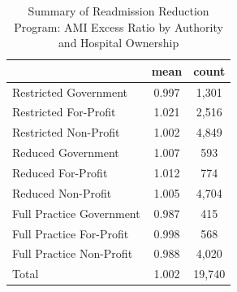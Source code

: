 \begin{table}[htbp]\centering
\def\sym#1{\ifmmode^{#1}\else\(^{#1}\)\fi}
\caption{Summary of Readmission Reduction Program: AMI Excess Ratio by Authority and Hospital Ownership}
\begin{tabular}{l*{1}{cc}}
\toprule
                    &        mean&       count\\
\midrule
Restricted Government&       0.997&       1,301\\
Restricted For-Profit&       1.021&       2,516\\
Restricted Non-Profit&       1.002&       4,849\\
Reduced Government  &       1.007&         593\\
Reduced For-Profit  &       1.012&         774\\
Reduced Non-Profit  &       1.005&       4,704\\
Full Practice Government&       0.987&         415\\
Full Practice For-Profit&       0.998&         568\\
Full Practice Non-Profit&       0.988&       4,020\\
Total               &       1.002&      19,740\\
\bottomrule
\end{tabular}
\end{table}

